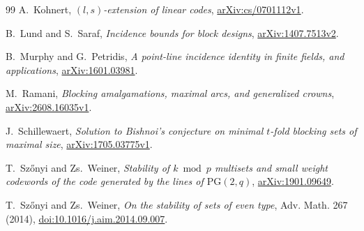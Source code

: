 \documentclass[11pt]{article}
\numberwithin{equation}{section}
\theoremstyle{definition}
\theoremstyle{remark}
\newcommand{\PG}{\mathrm{PG}}
\begin{document}
\begin{thebibliography}{99}
A.~Kohnert,
\emph{\((l,s)\)-extension of linear codes},
\href{https://arxiv.org/abs/cs/0701112}{arXiv:cs/0701112v1}.

B.~Lund and S.~Saraf,
\emph{Incidence bounds for block designs},
\href{https://arxiv.org/abs/1407.7513}{arXiv:1407.7513v2}.

B.~Murphy and G.~Petridis,
\emph{A point-line incidence identity in finite fields, and applications},
\href{https://arxiv.org/abs/1601.03981}{arXiv:1601.03981}.

M.~Ramani,
\emph{Blocking amalgamations, maximal arcs, and generalized crowns},
\href{https://arxiv.org/abs/2608.16035}{arXiv:2608.16035v1}.

J.~Schillewaert,
\emph{Solution to Bishnoi's conjecture on minimal \(t\)-fold blocking sets of
maximal size},
\href{https://arxiv.org/abs/1705.03775}{arXiv:1705.03775v1}.

T.~Sz\H{o}nyi and Zs.~Weiner,
\emph{Stability of \(k\bmod p\) multisets and small weight codewords of the
code generated by the lines of \(\PG(2,q)\)},
\href{https://arxiv.org/abs/1901.09649}{arXiv:1901.09649}.

T.~Sz\H{o}nyi and Zs.~Weiner,
\emph{On the stability of sets of even type}, Adv. Math. 267 (2014),
\href{https://doi.org/10.1016/j.aim.2014.09.007}{doi:10.1016/j.aim.2014.09.007}.

\end{thebibliography}
\end{document}
